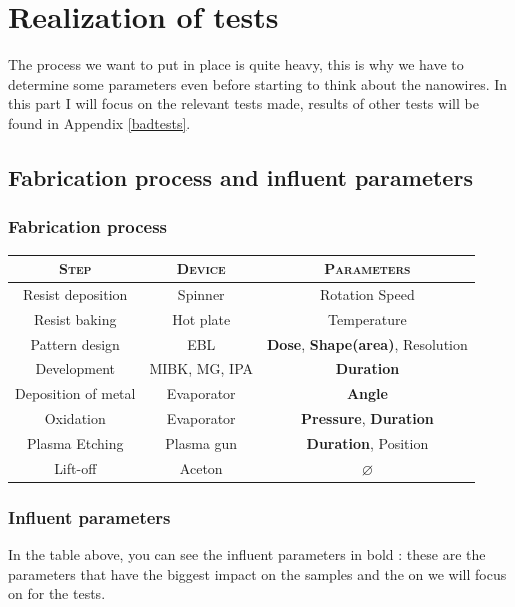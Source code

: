 \chapter{Realization of tests}
\label{Chap3}

The process we want to put in place is quite heavy, this is why we have to determine some parameters even before starting to think about the nanowires. In this part I will focus on the relevant tests made, results of other tests will be found in Appendix \ref{badtests}.

    \section{Fabrication process and influent parameters}
        
        \subsection{Fabrication process}
        
        
        \vspace{0.5cm}
         
        \begin{tabular}{|c|c|c|}
        \hline
        \textsc{Step}&\textsc{Device}&\textsc{Parameters}\\
        \hline
        Resist deposition&Spinner&Rotation Speed\\
        \hline
        Resist baking&Hot plate&Temperature\\
        \hline
        Pattern design&EBL&\textbf{Dose}, \textbf{Shape(area)}, Resolution\\
        \hline
        Development&MIBK, MG, IPA&\textbf{Duration}\\ 
        \hline
        Deposition of metal&Evaporator&\textbf{Angle}\\
        \hline
        Oxidation&Evaporator&\textbf{Pressure}, \textbf{Duration}\\
        \hline
        Plasma Etching&Plasma gun&\textbf{Duration}, Position\\
        \hline
        Lift-off&Aceton&$\varnothing$ \\
        \hline
        \end{tabular}
        
        \vspace{0.5cm}
        
        \subsection{Influent parameters}
            In the table above, you can see the influent parameters in bold : these are the parameters that have the biggest impact on the samples and the on we will focus on for the tests.
            
